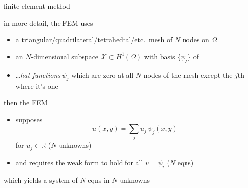 \documentclass[hide notes,intlimits,usenames,dvipsnames]{beamer}
\newcommand{\RR}{\mathbb{R}}
\begin{document}
\begin{frame}{finite element method}

in more detail, the FEM uses
\begin{itemize}
\item a {\footnotesize triangular/quadrilateral/tetrahedral/etc.}~mesh of $N$ nodes on $\Omega$
\item an $N$-dimensional subspace $\mathcal{X} \subset H^1(\Omega)$ with basis $\{\psi_j\}$ of
\item \begin{minipage}[t]{50mm}
\dots \emph{hat functions} $\psi_j$ which are zero at all $N$ nodes of the mesh except the $j$th where it's one
\end{minipage}
\qquad
\begin{minipage}[t]{40mm}
\vspace{-4mm}
\begin{tikzpicture}[scale=0.6, z={(.707,.3)}, baseline]

\end{tikzpicture}
\end{minipage}
\end{itemize}

\vspace{-3mm}
then the FEM
\begin{itemize}
\item supposes
   $$u(x,y) = \sum_j u_{j}\, \psi_{j}(x,y)$$
for $u_j\in \RR$ ($N$ unknowns)
\item and requires the weak form to hold for all $v=\psi_i$ ($N$ eqns)
\end{itemize}

\medskip
which yields a system of $N$ eqns in $N$ unknowns
\end{frame}
\end{document}
